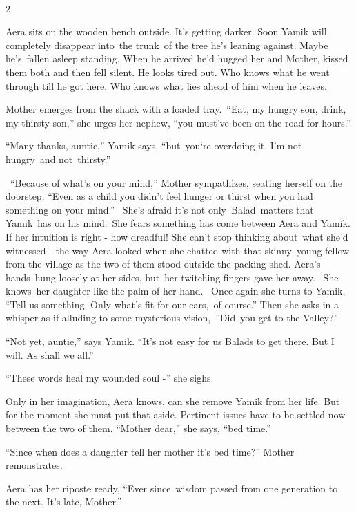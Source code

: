 \documentclass[twoside,11pt]{book}
\begin{document}
~

2

{Aera sits on the wooden bench
out}side{. }It's getting darker.
Soon{ Yamik will completely disappear into~the trunk~of the tree he's
leaning against. Maybe he{}'s\ fallen asleep standing. When he }arrived he{}'d hugged her and Mother, kissed them both
and then fell silent. He looks tired out. Who knows what he went through till he got here. Who knows what lies ahead of
him when he leaves.\ 

Mother emerges from the shack with a loaded tray.\ {{}``Eat, my hungry
son, drink, my thirsty son,'' she urges her
}{nephew}{, ``you must've been on the road for
hours.''}

{{}``Many thanks, auntie,'' Yamik says,
``but\ you`re overdoing it. I'm not hungry\ }and
not\ {thirsty.''}

\ {}``Because of what's on your mind,'' Mother sympathizes, seating herself on the doorstep. ``Even as a child you
didn't feel hunger or thirst when you had something on your mind.''~ She{}'s afraid it{}'s not only~Balad\ matters that
Yamik\ has on his mind.\ She fears something has come between Aera and Yamik. If her intuition is right - how dreadful!
She can{}'t stop thinking about\ what she{}'d witnessed - the way Aera looked when she chatted with that
skinny{\ }young fellow from the village as the two of them stood outside the packing shed. Aera's
hands~hung loosely at her sides, but\ her twitching fingers gave her away.~ She knows~her daughter like the palm of her
hand.~ Once again she turns to Yamik, ``Tell us something. Only what's fit for our ears,\ of course.{}'' Then she asks
in a whisper as if alluding to some mysterious vision,\ {}''Did{\ }you get to the Valley?'' 

{}``Not yet, auntie,'' says Yamik. ``It's not easy for us Balads to get there. But I will. As shall we all.'' 

{}``These words heal my wounded soul -'' she sighs.

Only in her imagination, Aera knows, can she remove Yamik from her life. But for the moment she must put that aside.
Pertinent issues have to be settled now between the two of them. ``Mother dear,'' she says, ``bed time.''~ 

{}``Since when does a daughter tell her mother it's bed time?''  Mother remonstrates.

Aera has her riposte ready, ``Ever since~wisdom passed from one generation to the next. It's late, Mother.'' 
\end{document}
